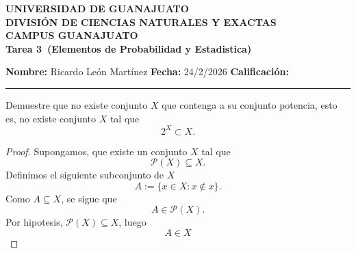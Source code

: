 \documentclass[12pt,a4paper]{article}
\newcommand{\alumno}{Ricardo León Martínez}
\newcommand{\materia}{Elementos de Probabilidad y Estadistica}
\newcommand{\tarea}{Tarea 3}
\newcommand{\fecha}{24/2/2026}
\begin{document}
    \begin{center}
        {\large\textbf{UNIVERSIDAD DE GUANAJUATO}}\\[0.3cm]
        {\normalsize\textbf{DIVISIÓN DE CIENCIAS NATURALES Y EXACTAS}}\\
        {\normalsize\textbf{CAMPUS GUANAJUATO}}\\[1cm]

        {\Large\textbf{\tarea\ (\materia)}}\\[1cm]
    \end{center}

    \noindent
    \textbf{Nombre:} \alumno 
    \hfill 
    \textbf{Fecha:} \fecha 
    \hfill 
    \textbf{Calificación:} \rule{3cm}{0.4pt}

    \vspace{0.3cm}

    \begin{mdframed}[style=mdbluebox,frametitle={Ejercicio 1}]
        Demuestre que no existe conjunto $X$ que contenga a su conjunto potencia, esto es, no existe conjunto $X$ tal que
        \begin{equation*}
            2^X \subset X.
        \end{equation*}
    \end{mdframed}

    \begin{proof}
        Supongamos, que existe un conjunto $X$ tal que
        \begin{equation*}
            \mathcal{P}(X)\subseteq X.
        \end{equation*}
        Definimos el siguiente subconjunto de $X$
        \begin{equation*}
            A:=\{x\in X:x\notin x\}.
        \end{equation*}
        Como $A\subseteq X$, se sigue que
        \begin{equation*}
            A\in\mathcal{P}(X).
        \end{equation*}
        Por hipotesis, $\mathcal{P}(X)\subseteq X$, luego
        \begin{equation*}
            A\in X
        \end{equation*}
    \end{proof}
\end{document}
